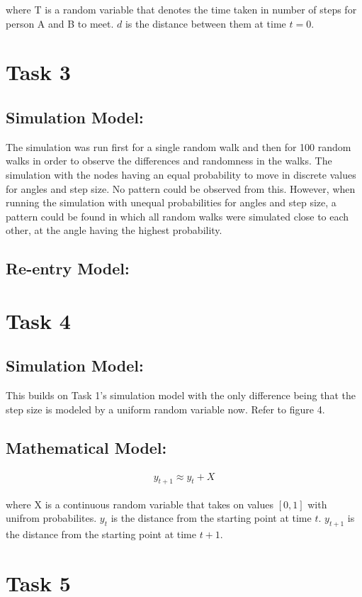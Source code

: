 \documentclass[8pt]{extarticle}
\begin{document}
where T is a random variable that denotes the time taken in number of steps for person A and B to meet.
$d$ is the distance between them at time $t = 0$.


\section*{Task 3}
\subsection*{Simulation Model:}
The simulation was run first for a single random walk and then for 100 random walks in order to observe the differences and randomness in the walks. The simulation with the nodes having an equal probability to move in discrete values for angles and step size. No pattern could be observed from this. However, when running the simulation with unequal probabilities for angles and step size, a pattern could be found in which all random walks were simulated close to each other, at the angle having the highest probability.

\subsection*{Re-entry Model:}


\section*{Task 4}
\subsection*{Simulation Model:}
This builds on Task 1's simulation model with the only difference being that the step size is modeled by a uniform random variable now.
Refer to figure 4.

\subsection*{Mathematical Model:}
\begin{align*}
    y_{t+1} \approx y_{t} + X
\end{align*}

where X is a continuous random variable that takes on values $[0, 1]$ with unifrom probabilites.
$y_t$ is the distance from the starting point at time $t$. $y_{t+1}$ is the distance from the starting point at time $t+1$.


\section*{Task 5}
\end{document}
